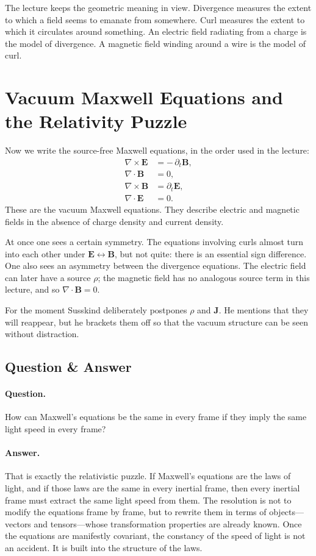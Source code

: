 The lecture keeps the geometric meaning in view. Divergence measures the extent to which a field seems to emanate from somewhere. Curl measures the extent to which it circulates around something. An electric field radiating from a charge is the model of divergence. A magnetic field winding around a wire is the model of curl.

\section{Vacuum Maxwell Equations and the Relativity Puzzle}

Now we write the source-free Maxwell equations, in the order used in the lecture:
\begin{align}
\nabla \times \mathbf E &= -\,\partial_t \mathbf B,\\
\nabla \cdot \mathbf B &= 0,\\
\nabla \times \mathbf B &= \partial_t \mathbf E,\\
\nabla \cdot \mathbf E &= 0.
\end{align}
These are the vacuum Maxwell equations. They describe electric and magnetic fields in the absence of charge density and current density.

At once one sees a certain symmetry. The equations involving curls almost turn into each other under \(\mathbf E \leftrightarrow \mathbf B\), but not quite: there is an essential sign difference. One also sees an asymmetry between the divergence equations. The electric field can later have a source \(\rho\); the magnetic field has no analogous source term in this lecture, and so \(\nabla \cdot \mathbf B = 0\).

For the moment Susskind deliberately postpones \(\rho\) and \(\mathbf J\). He mentions that they will reappear, but he brackets them off so that the vacuum structure can be seen without distraction.

\subsection{Question \& Answer}

\paragraph{Question.} How can Maxwell's equations be the same in every frame if they imply the same light speed in every frame?

\paragraph{Answer.} That is exactly the relativistic puzzle. If Maxwell's equations are the laws of light, and if those laws are the same in every inertial frame, then every inertial frame must extract the same light speed from them. The resolution is not to modify the equations frame by frame, but to rewrite them in terms of objects---vectors and tensors---whose transformation properties are already known. Once the equations are manifestly covariant, the constancy of the speed of light is not an accident. It is built into the structure of the laws.

